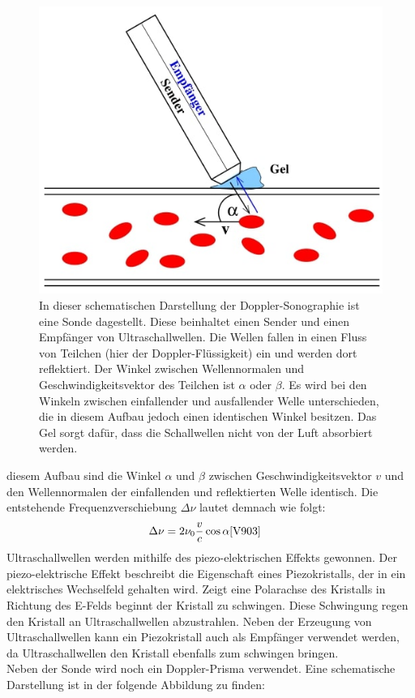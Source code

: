 \begin{figure}[H]
    \centering
    \includegraphics[width=0.5\linewidth]{images/Schema.jpg}
    \caption{In dieser schematischen Darstellung der Doppler-Sonographie \cite{V903} ist eine Sonde dagestellt. Diese beinhaltet einen Sender und einen Empfänger von Ultraschallwellen.
    Die Wellen fallen in einen Fluss von Teilchen (hier der Doppler-Flüssigkeit) ein und werden dort reflektiert. Der Winkel zwischen Wellennormalen und Geschwindigkeitsvektor des Teilchen ist $\alpha$
    oder $\beta$. Es wird bei den Winkeln zwischen einfallender und ausfallender Welle unterschieden, die in diesem Aufbau jedoch einen identischen Winkel besitzen. Das Gel sorgt dafür,
    dass die Schallwellen nicht von der Luft absorbiert werden.}
    \label{fig:1}
\end{figure}

    \justifying diesem Aufbau sind die Winkel $\alpha$ und $\beta$ zwischen Geschwindigkeitsvektor $v$ und den Wellennormalen der einfallenden und reflektierten Welle identisch. Die 
    entstehende Frequenzverschiebung $\Delta\nu$ lautet demnach wie folgt:
    \begin{align}
        \Delta\nu &= 2 \nu_0 \frac{v}{c} \cos \alpha \label{eq:3} \text{\cite{V903}}
    \end{align} 
    \justifying Ultraschallwellen werden mithilfe des piezo-elektrischen Effekts gewonnen. Der piezo-elektrische Effekt beschreibt die Eigenschaft eines Piezokristalls,
    der in ein elektrisches Wechselfeld gehalten wird. Zeigt eine Polarachse des Kristalls in Richtung des E-Felds beginnt der Kristall zu schwingen. Diese Schwingung regen den Kristall an
    Ultraschallwellen abzustrahlen.
    Neben der Erzeugung von Ultraschallwellen kann ein Piezokristall auch als Empfänger verwendet werden, da Ultraschallwellen den Kristall ebenfalls zum schwingen bringen.\\
    Neben der Sonde wird noch ein Doppler-Prisma verwendet. Eine schematische Darstellung ist in der folgende Abbildung zu finden:

